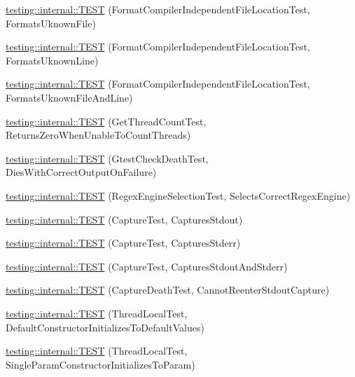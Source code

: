 \begin{DoxyCompactItemize}
\hyperlink{namespacetesting_1_1internal_a65ad1cad17717c1b8ac4c2d4bef5e079}{testing\+::internal\+::\+T\+E\+ST} (Format\+Compiler\+Independent\+File\+Location\+Test, Formats\+Uknown\+File)
\item 
\hyperlink{namespacetesting_1_1internal_a0315a64a661f249628f2884080e0614f}{testing\+::internal\+::\+T\+E\+ST} (Format\+Compiler\+Independent\+File\+Location\+Test, Formats\+Uknown\+Line)
\item 
\hyperlink{namespacetesting_1_1internal_a8b9aee556f3dec6e67c35830ba55e0bd}{testing\+::internal\+::\+T\+E\+ST} (Format\+Compiler\+Independent\+File\+Location\+Test, Formats\+Uknown\+File\+And\+Line)
\item 
\hyperlink{namespacetesting_1_1internal_a5ad8299ae9325382f01b945f4f81711e}{testing\+::internal\+::\+T\+E\+ST} (Get\+Thread\+Count\+Test, Returns\+Zero\+When\+Unable\+To\+Count\+Threads)
\item 
\hyperlink{namespacetesting_1_1internal_afabff70df09a0e4fcda96dd36460c2b9}{testing\+::internal\+::\+T\+E\+ST} (Gtest\+Check\+Death\+Test, Dies\+With\+Correct\+Output\+On\+Failure)
\item 
\hyperlink{namespacetesting_1_1internal_a198f7132f76dd44d48dac54dc5d38fbb}{testing\+::internal\+::\+T\+E\+ST} (Regex\+Engine\+Selection\+Test, Selects\+Correct\+Regex\+Engine)
\item 
\hyperlink{namespacetesting_1_1internal_a0b658d88cea3a2fe6775b1b269c0204b}{testing\+::internal\+::\+T\+E\+ST} (Capture\+Test, Captures\+Stdout)
\item 
\hyperlink{namespacetesting_1_1internal_abbc9510a4f690912c32835213d95198f}{testing\+::internal\+::\+T\+E\+ST} (Capture\+Test, Captures\+Stderr)
\item 
\hyperlink{namespacetesting_1_1internal_a341ff65f3ca44b27fc51f03a9a05bee8}{testing\+::internal\+::\+T\+E\+ST} (Capture\+Test, Captures\+Stdout\+And\+Stderr)
\item 
\hyperlink{namespacetesting_1_1internal_a325a786fb22b87e5aa8d8f584b42ab09}{testing\+::internal\+::\+T\+E\+ST} (Capture\+Death\+Test, Cannot\+Reenter\+Stdout\+Capture)
\item 
\hyperlink{namespacetesting_1_1internal_af366e28e373f36480decc2ea586f48f0}{testing\+::internal\+::\+T\+E\+ST} (Thread\+Local\+Test, Default\+Constructor\+Initializes\+To\+Default\+Values)
\item 
\hyperlink{namespacetesting_1_1internal_a5a52dd578217050e621ebd2aace97a70}{testing\+::internal\+::\+T\+E\+ST} (Thread\+Local\+Test, Single\+Param\+Constructor\+Initializes\+To\+Param)

\end{DoxyCompactItemize}

